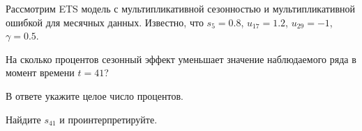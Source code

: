 
\begin{question}
Рассмотрим ETS модель с мультипликативной сезонностью и мультипликативной ошибкой для месячных данных.
Известно, что \(s_{5} = 0.8\), \(u_{17} = 1.2\), \(u_{29} = -1\), \(\gamma = 0.5\).

На сколько процентов сезонный эффект уменьшает значение наблюдаемого ряда в момент времени \(t=41\)?

В ответе укажите целое число процентов.
\end{question}

\begin{solution}
Найдите \(s_{41}\) и проинтерпретируйте.
\end{solution}

